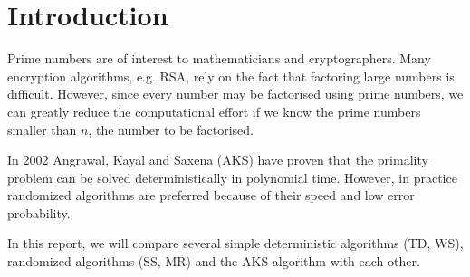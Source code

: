 \section{Introduction}

Prime numbers are of interest to mathematicians and cryptographers.
Many encryption algorithms, e.g. RSA, rely on the fact that factoring large numbers is difficult.
However, since every number may be factorised using prime numbers,
we can greatly reduce the computational effort if we know the prime numbers smaller than $n$, the number to be factorised.

In 2002 Angrawal, Kayal and Saxena (AKS) \cite{AKS} have proven that the primality problem can be solved deterministically in polynomial time.
However, in practice randomized algorithms are preferred because of their speed and low error probability.

In this report, we will compare several simple deterministic algorithms (TD, WS), randomized algorithms (SS, MR) and the AKS algorithm with each other.



% 
% 
